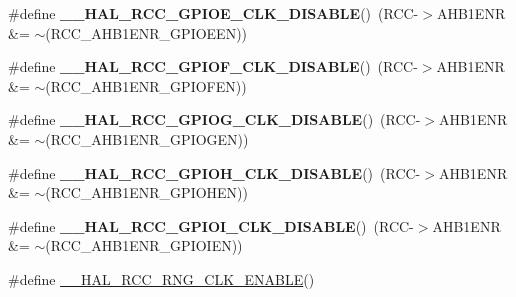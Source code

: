 \begin{DoxyCompactItemize}
\item 
\mbox{\label{group___r_c_c_ex___peripheral___clock___enable___disable_gad8982750e98b22493ae0677b3021b01b}} 
\#define {\bfseries \+\_\+\+\_\+\+H\+A\+L\+\_\+\+R\+C\+C\+\_\+\+G\+P\+I\+O\+E\+\_\+\+C\+L\+K\+\_\+\+D\+I\+S\+A\+B\+LE}()~(R\+CC-\/$>$A\+H\+B1\+E\+NR \&= $\sim$(R\+C\+C\+\_\+\+A\+H\+B1\+E\+N\+R\+\_\+\+G\+P\+I\+O\+E\+EN))
\item 
\mbox{\label{group___r_c_c_ex___peripheral___clock___enable___disable_ga84c2248eab0a30bd8f4912233abbf34a}} 
\#define {\bfseries \+\_\+\+\_\+\+H\+A\+L\+\_\+\+R\+C\+C\+\_\+\+G\+P\+I\+O\+F\+\_\+\+C\+L\+K\+\_\+\+D\+I\+S\+A\+B\+LE}()~(R\+CC-\/$>$A\+H\+B1\+E\+NR \&= $\sim$(R\+C\+C\+\_\+\+A\+H\+B1\+E\+N\+R\+\_\+\+G\+P\+I\+O\+F\+EN))
\item 
\mbox{\label{group___r_c_c_ex___peripheral___clock___enable___disable_ga9d4578e9566823639e049fe69cbaba69}} 
\#define {\bfseries \+\_\+\+\_\+\+H\+A\+L\+\_\+\+R\+C\+C\+\_\+\+G\+P\+I\+O\+G\+\_\+\+C\+L\+K\+\_\+\+D\+I\+S\+A\+B\+LE}()~(R\+CC-\/$>$A\+H\+B1\+E\+NR \&= $\sim$(R\+C\+C\+\_\+\+A\+H\+B1\+E\+N\+R\+\_\+\+G\+P\+I\+O\+G\+EN))
\item 
\mbox{\label{group___r_c_c_ex___peripheral___clock___enable___disable_ga1eb7dd0a520cef518fb624bf7117b7e1}} 
\#define {\bfseries \+\_\+\+\_\+\+H\+A\+L\+\_\+\+R\+C\+C\+\_\+\+G\+P\+I\+O\+H\+\_\+\+C\+L\+K\+\_\+\+D\+I\+S\+A\+B\+LE}()~(R\+CC-\/$>$A\+H\+B1\+E\+NR \&= $\sim$(R\+C\+C\+\_\+\+A\+H\+B1\+E\+N\+R\+\_\+\+G\+P\+I\+O\+H\+EN))
\item 
\mbox{\label{group___r_c_c_ex___peripheral___clock___enable___disable_gacd0be8e0abc7a66d55f5bb663df1098a}} 
\#define {\bfseries \+\_\+\+\_\+\+H\+A\+L\+\_\+\+R\+C\+C\+\_\+\+G\+P\+I\+O\+I\+\_\+\+C\+L\+K\+\_\+\+D\+I\+S\+A\+B\+LE}()~(R\+CC-\/$>$A\+H\+B1\+E\+NR \&= $\sim$(R\+C\+C\+\_\+\+A\+H\+B1\+E\+N\+R\+\_\+\+G\+P\+I\+O\+I\+EN))
\item 
\#define \mbox{\hyperlink{group___r_c_c_ex___peripheral___clock___enable___disable_ga01b37cc75f9a14a55b9e89e8ccfac8af}{\+\_\+\+\_\+\+H\+A\+L\+\_\+\+R\+C\+C\+\_\+\+R\+N\+G\+\_\+\+C\+L\+K\+\_\+\+E\+N\+A\+B\+LE}}()

\end{DoxyCompactItemize}
